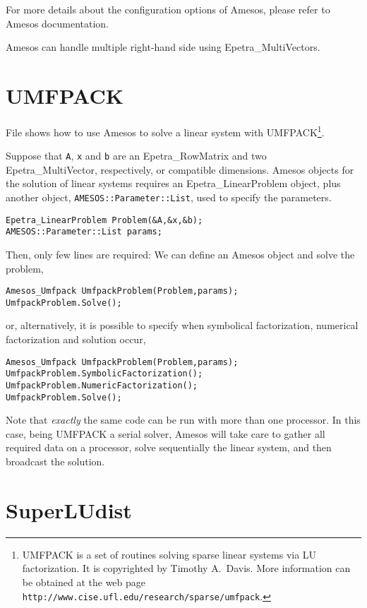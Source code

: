 For more details about the configuration options of Amesos, please refer
to Amesos documentation.

\begin{remark}
  Amesos can handle multiple right-hand side using Epetra\_MultiVectors.
\end{remark}


\section{UMFPACK}
\label{sec:umfpack}

File  shows how to use Amesos to solve a linear
system with UMFPACK\footnote{UMFPACK is a set of routines solving sparse
  linear systems via LU factorization. It is copyrighted by Timothy
  A.~Davis. More information can be obtained at the web page 
  {\tt http://www.cise.ufl.edu/research/sparse/umfpack}. }.

Suppose that \verb!A!, \verb!x! and \verb!b! are an Epetra\_RowMatrix
and two Epetra\_MultiVector, respectively, or compatible dimensions.
Amesos objects for the solution of linear systems requires an
Epetra\_LinearProblem object, plus another object,
\verb!AMESOS::Parameter::List!, used to specify the parameters.
\begin{verbatim}
Epetra_LinearProblem Problem(&A,&x,&b);
AMESOS::Parameter::List params;
\end{verbatim}
Then, only few lines are required: We can define an Amesos object and
solve the problem,
\begin{verbatim}
Amesos_Umfpack UmfpackProblem(Problem,params);
UmfpackProblem.Solve();
\end{verbatim}
or, alternatively, it is possible to specify when symbolical
factorization, numerical factorization and solution occur,
\begin{verbatim}
Amesos_Umfpack UmfpackProblem(Problem,params); 
UmfpackProblem.SymbolicFactorization();
UmfpackProblem.NumericFactorization();
UmfpackProblem.Solve();
\end{verbatim}
Note that {\sl exactly} the same code can be run with more than one
processor. In this case, being UMFPACK a serial solver, Amesos will take
care to gather all required data on a processor, solve sequentially
the linear system, and then broadcast the solution.


\section{SuperLUdist}
\label{sec:superludist}

